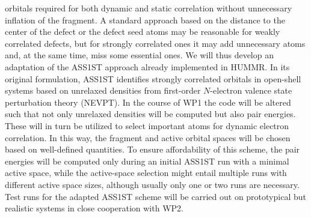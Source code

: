 \documentclass[a4paper,11pt,headings=normal]{scrartcl}
\begin{document}
\begin{itemize}
orbitals required for both dynamic and static correlation without 
unnecessary inflation of the fragment. A standard approach based on the 
distance to the center of the defect or the defect seed atoms may be reasonable 
for weakly correlated defects, but for strongly correlated ones it may add 
unnecessary atoms and, at the same time, miss some essential ones. We will thus 
develop an adaptation of the ASS1ST approach already implemented in 
HUMMR.\autocite{Roemelt2019, Roemelt2020} In its original formulation, ASS1ST 
identifies strongly correlated orbitals in open-shell systems based on 
unrelaxed densities from first-order $N$-electron valence state perturbation 
theory (NEVPT). In the course of WP1 the code will be altered such 
that not only unrelaxed densities will be computed but also pair energies. 
These will in turn be utilized to select important atoms for dynamic electron 
correlation. In this way, the fragment and active orbital spaces will be chosen 
based on well-defined quantities. To ensure affordability of this scheme, the 
pair energies will be computed only during an initial ASS1ST run with a minimal 
active space, while the active-space selection might entail multiple runs with 
different active space sizes, although usually only one or two runs are 
necessary.\autocite{Roemelt2020a,Nam2024} Test runs for the adapted ASS1ST 
scheme will be carried out on prototypical but realistic systems in close 
cooperation with WP2.\\



\end{itemize}
\end{document}
